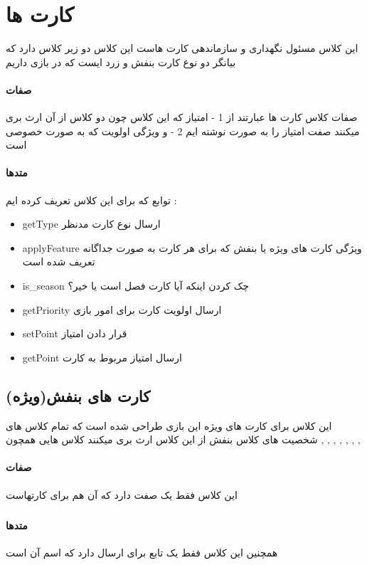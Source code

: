 \documentclass[pdf,titlepage,a4paper]{report}
\begin{document}
	\newpage
	\section{کارت ها}
	این کلاس مسئول نگهداری و سازماندهی کارت هاست این کلاس دو زیر کلاس دارد که بیانگر دو نوع کارت بنفش و زرد ایست که در بازی داریم

	\paragraph{صفات}
	صفات کلاس کارت ها  عبارتند از 
	1 - امتیاز که این کلاس چون دو کلاس از آن ارث بری میکنند صفت امتیاز را به صورت   نوشته ایم
	2 - و ویژگی اولویت که به صورت خصوصی است

	\paragraph{متدها}
	توابع که برای این کلاس تعریف کرده ایم :

	\begin{latin}
		\begin{itemize}
			\item getType ارسال نوع کارت مدنظر
			\item applyFeature ویژگی کارت های ویژه یا بنفش که برای هر کارت به صورت جداگانه تعریف شده است
			\item is\_season چک کردن اینکه آیا کارت فصل است یا خیر؟
			\item getPriority ارسال اولویت کارت برای امور بازی 
			\item setPoint  قرار دادن امتیاز
			\item getPoint ارسال امتیاز مربوط به کارت
		\end{itemize}
	\end{latin}
	
	
	\subsection{کارت های بنفش(ویژه)}
	این کلاس برای کارت های ویژه این بازی طراحی شده است که تمام کلاس های شخصیت های کلاس بنفش از این کلاس ارث بری میکنند
	کلاس هایی همچون  ,  ,  ,  ,  ,  ,  ,   
	\paragraph{صفات}
	این کلاس فقط یک صفت دارد که آن هم برای   کارتهاست
	\subparagraph{}
	
	\paragraph{متدها}
	همچنین این کلاس فقط یک تابع برای ارسال  دارد که اسم آن  است
\end{document}
